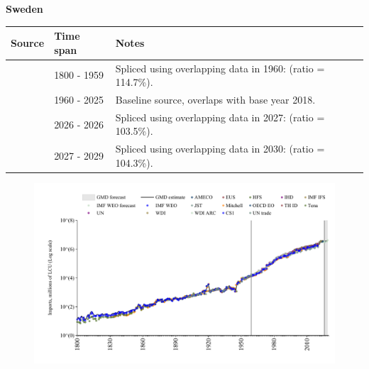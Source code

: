 \documentclass[12pt,a4paper,landscape]{article}
\begin{document}
\begin{adjustbox}{max totalsize={\paperwidth}{\paperheight},center}
\begin{minipage}[t][\textheight][t]{\textwidth}
\vspace*{0.5cm}
{}
\begin{center}
{\Large\bfseries Sweden}
\end{center}
\vspace{0.5cm}
\begin{table}[H]
\centering
\small
\begin{tabular}{|l|l|l|}
\hline
\textbf{Source} & \textbf{Time span} & \textbf{Notes} \\
\hline
\rowcolor{white}\cite{CS1_SWE}& 1800 - 1959 &Spliced using overlapping data in 1960: (ratio = 114.7\%).\\
\rowcolor{lightgray}\cite{OECD_EO}& 1960 - 2025 &Baseline source, overlaps with base year 2018.\\
\rowcolor{white}\cite{AMECO}& 2026 - 2026 &Spliced using overlapping data in 2027: (ratio = 103.5\%).\\
\rowcolor{lightgray}\cite{IMF_WEO_forecast}& 2027 - 2029 &Spliced using overlapping data in 2030: (ratio = 104.3\%).\\
\hline
\end{tabular}
\end{table}
\begin{figure}[H]
\centering
\includegraphics[width=\textwidth,height=0.6\textheight,keepaspectratio]{graphs/SWE_imports.pdf}
\end{figure}
\end{minipage}
\end{adjustbox}
\end{document}
